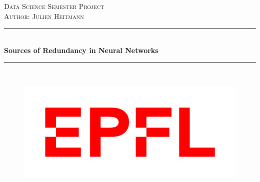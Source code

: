 \begin{titlepage}

\newcommand{\HRule}{\rule{\linewidth}{0.5mm}} %

\center %
 

\textsc{\LARGE Data Science Semester Project}\\[1.5cm] %
\textsc{\large{Author: }Julien Heitmann}\\[0.5cm] %



\HRule \\[0.6cm]
{ \huge \bfseries Sources of Redundancy in Neural Networks}\\[0.5cm] %
\HRule \\[1.5cm]
 



\begin{figure}[!h] 
        \centering \includegraphics[width=0.6\columnwidth]{images/EPFL_Logo_Digital_RGB_PROD.jpg}
\end{figure}

\vfill %
\end{titlepage}
\tableofcontents
\newpage
\justify

